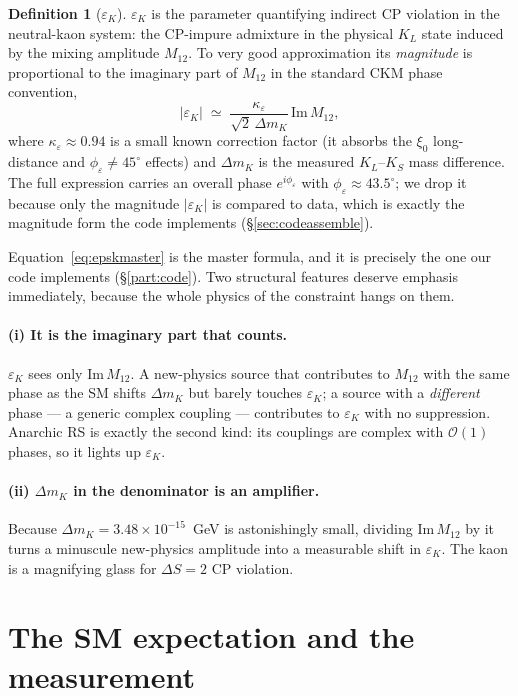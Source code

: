 \documentclass[11pt]{article}
\newcommand{\epsK}{\varepsilon_K}
\newcommand{\eps}{\varepsilon}
\newcommand{\Mtwelve}{M_{12}}
\newcommand{\ImMtwelve}{\mathrm{Im}\,M_{12}}
\newcommand{\dmk}{\Delta m_K}
\theoremstyle{definition}
\newtheorem{definition}{Definition}
\begin{document}
\begin{definition}[$\varepsilon_K$]
$\epsK$ is the parameter quantifying indirect CP violation in the neutral-kaon
system: the CP-impure admixture in the physical $K_L$ state induced by the
mixing amplitude $\Mtwelve$. To very good approximation its \emph{magnitude} is
proportional to the imaginary part of $\Mtwelve$ in the standard CKM phase
convention,
\begin{equation}
|\epsK| \;\simeq\; \frac{\kappa_\eps}{\sqrt{2}\,\dmk}\,\ImMtwelve ,
\label{eq:epskmaster}
\end{equation}
where $\kappa_\eps\approx0.94$ is a small known correction factor (it absorbs the
$\xi_0$ long-distance and $\phi_\eps\neq45^\circ$ effects) and $\dmk$ is the
measured $K_L$--$K_S$ mass difference. The full expression carries an overall phase
$e^{i\phi_\eps}$ with $\phi_\eps\approx43.5^\circ$; we drop it because only the
magnitude $|\epsK|$ is compared to data, which is exactly the magnitude form the
code implements (\S\ref{sec:codeassemble}).
\end{definition}

Equation~\eqref{eq:epskmaster} is the master formula, and it is precisely the one
our code implements (\S\ref{part:code}). Two structural features deserve emphasis
immediately, because the whole physics of the constraint hangs on them.

\paragraph{(i) It is the imaginary part that counts.} $\epsK$ sees only
$\ImMtwelve$. A new-physics source that contributes to $\Mtwelve$ with the same
phase as the SM shifts $\dmk$ but barely touches $\epsK$; a source with a
\emph{different} phase --- a generic complex coupling --- contributes to
$\epsK$ with no suppression. Anarchic RS is exactly the second kind: its couplings
are complex with $\mathcal{O}(1)$ phases, so it lights up $\epsK$.

\paragraph{(ii) $\dmk$ in the denominator is an amplifier.} Because $\dmk =
3.48\times10^{-15}$~GeV is astonishingly small, dividing $\ImMtwelve$ by it turns
a minuscule new-physics amplitude into a measurable shift in $\epsK$. The kaon is
a magnifying glass for $\Delta S=2$ CP violation.

\section{The SM expectation and the measurement}
\label{sec:smvalue}
\end{document}
